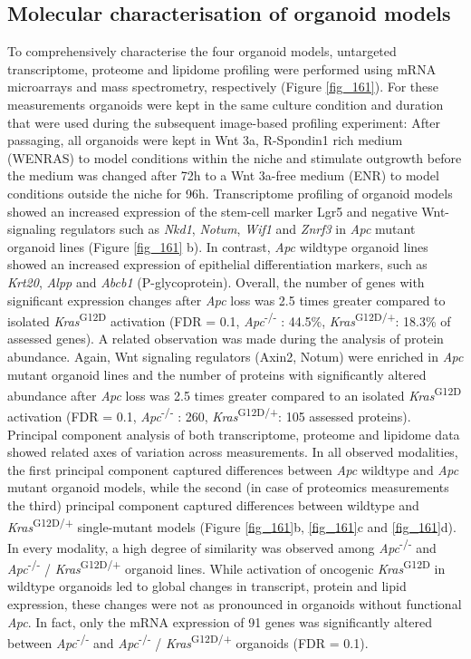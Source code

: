\begin{flushleft}
\subsection{Molecular characterisation of organoid models}
To comprehensively characterise the four organoid models, untargeted transcriptome, proteome and lipidome profiling were performed using mRNA microarrays and mass spectrometry, respectively (Figure \ref{fig_161}). For these measurements organoids were kept in the same culture condition and duration that were used during the subsequent image-based profiling experiment: After passaging, all organoids were kept in Wnt 3a, R-Spondin1 rich medium (WENRAS) to model conditions within the niche and stimulate outgrowth before the medium was changed after 72h to a Wnt 3a-free medium (ENR) to model conditions outside the niche for 96h. Transcriptome profiling of organoid models showed an increased expression of the stem-cell marker Lgr5 and negative Wnt-signaling regulators such as \textit{Nkd1}, \textit{Notum}, \textit{Wif1} and \textit{Znrf3} in \textit{Apc} mutant organoid lines (Figure \ref{fig_161} b). In contrast, \textit{Apc} wildtype organoid lines showed an increased expression of epithelial differentiation markers, such as \textit{Krt20}, \textit{Alpp} and \textit{Abcb1} (P-glycoprotein). Overall, the number of genes with significant expression changes after \textit{Apc} loss was 2.5 times greater compared to isolated \textit{Kras}\textsuperscript{G12D} activation (FDR = 0.1, \textit{Apc}\textsuperscript{-/-} : 44.5\%, \textit{Kras}\textsuperscript{G12D/+}: 18.3\% of assessed genes). A related observation was made during the analysis of protein abundance. Again, Wnt signaling regulators (Axin2, Notum) were enriched in \textit{Apc} mutant organoid lines and the number of proteins with significantly altered abundance after \textit{Apc} loss was 2.5 times greater compared to an isolated \textit{Kras}\textsuperscript{G12D} activation (FDR = 0.1, \textit{Apc}\textsuperscript{-/-} : 260, \textit{Kras}\textsuperscript{G12D/+}: 105 assessed proteins). Principal component analysis of both transcriptome, proteome and lipidome data showed related axes of variation across measurements. In all observed modalities, the first principal component captured differences between \textit{Apc} wildtype and \textit{Apc} mutant organoid models, while the second (in case of proteomics measurements the third) principal component captured differences between wildtype and \textit{Kras}\textsuperscript{G12D/+} single-mutant models (Figure \ref{fig_161}b, \ref{fig_161}c and \ref{fig_161}d). In every modality, a high degree of similarity was observed among \textit{Apc}\textsuperscript{-/-}  and \textit{Apc}\textsuperscript{-/-} / \textit{Kras}\textsuperscript{G12D/+} organoid lines. While activation of oncogenic \textit{Kras}\textsuperscript{G12D} in wildtype organoids led to global changes in transcript, protein and lipid expression, these changes were not as pronounced in organoids without functional \textit{Apc}. In fact, only the mRNA expression of 91 genes was significantly altered between \textit{Apc}\textsuperscript{-/-}  and \textit{Apc}\textsuperscript{-/-} / \textit{Kras}\textsuperscript{G12D/+} organoids (FDR = 0.1). 


\end{flushleft}
